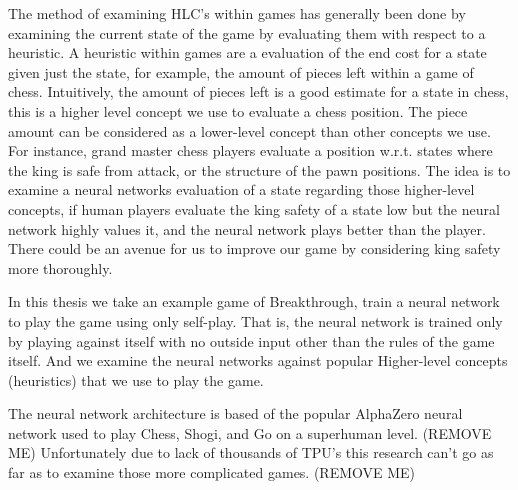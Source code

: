 The method of examining HLC's within games has generally been done by examining the
current state of the game by evaluating them with respect to a heuristic. A heuristic within
games are a evaluation of the end cost for a state given just the state, for example,
the amount of pieces left within a game of chess. Intuitively, the amount of pieces
left is a good estimate for a state in chess, this is a higher level concept we
use to evaluate a chess position. The piece amount can be considered as a lower-level concept
than other concepts we use. For instance, grand master chess players evaluate a position w.r.t. states
where the king is safe from attack, or the structure of the pawn positions.
The idea is to examine a neural networks evaluation of a state regarding
those higher-level concepts, if human players evaluate the king safety of a state
low but the neural network highly values it, and the neural network plays better
than the player. There could be an avenue for us to improve our game by considering king safety more thoroughly.

In this thesis we take an example game of Breakthrough, train a neural network to play the game
using only self-play. That is, the neural network is trained only by playing against
itself with no outside input other than the rules of the game itself. And we examine
the neural networks against popular Higher-level concepts (heuristics) that we use
to play the game.

The neural network architecture is based of the popular AlphaZero neural network
used to play Chess, Shogi, and Go on a superhuman level. (REMOVE ME) Unfortunately due to lack
of thousands of TPU's this research can't go as far as to examine those more complicated
games. (REMOVE ME)



